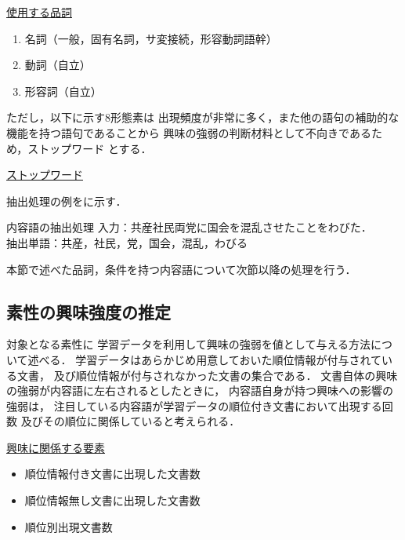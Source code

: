 \documentclass[japanese]{jnlp_1.4}
\newcounter{ex}
\def\ex#1{}
\def\exref#1{}
\begin{document}
\underline{使用する品詞}
\begin{enumerate}
 \item 名詞（一般，固有名詞，サ変接続，形容動詞語幹）
 \item 動詞（自立）
 \item 形容詞（自立）
\end{enumerate}

ただし，以下に示す8形態素は
出現頻度が非常に多く，また他の語句の補助的な機能を持つ語句であることから
興味の強弱の判断材料として不向きであるため，ストップワード
とする．

\underline{ストップワード}
\vspace{0.5\baselineskip}
\begin{center}
\end{center}
\vspace{0.5\baselineskip}

抽出処理の例を\exref{chasenex}に示す．


\begin{itembox}{\ex{}\label{chasenex}内容語の抽出処理}
入力：共産社民両党に国会を混乱させたことをわびた．\\
抽出単語：共産，社民，党，国会，混乱，わびる
\end{itembox}

本節で述べた品詞，条件を持つ内容語について次節以降の処理を行う．



\subsection{素性の興味強度の推定}\label{calc_int}


対象となる素性に
学習データを利用して興味の強弱を値として与える方法について述べる．
学習データはあらかじめ用意しておいた順位情報が付与されている文書，
及び順位情報が付与されなかった文書の集合である．
文書自体の興味の強弱が内容語に左右されるとしたときに，
内容語自身が持つ興味への影響の強弱は，
注目している内容語が学習データの順位付き文書において出現する回数
及びその順位に関係していると考えられる．

\underline{興味に関係する要素}
\begin{itemize}
 \item 順位情報付き文書に出現した文書数
 \item 順位情報無し文書に出現した文書数
 \item 順位別出現文書数
\end{itemize}
\end{document}
